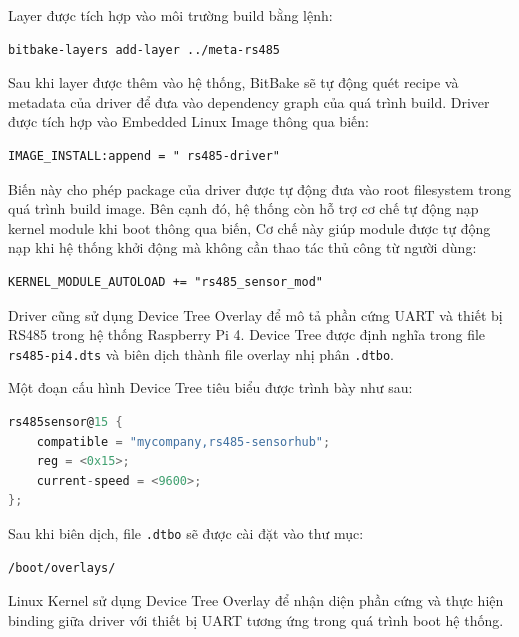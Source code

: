 \medskip 

\renewcommand*\DTstyle{\ttfamily} 

Layer được tích hợp vào môi trường build bằng lệnh:

\begin{verbatim}
bitbake-layers add-layer ../meta-rs485
\end{verbatim}

Sau khi layer được thêm vào hệ thống, BitBake sẽ tự động quét recipe và metadata của driver để đưa vào dependency graph của quá trình build.
Driver được tích hợp vào Embedded Linux Image thông qua biến:

\begin{verbatim}
IMAGE_INSTALL:append = " rs485-driver"
\end{verbatim}

Biến này cho phép package của driver được tự động đưa vào root filesystem trong quá trình build image.
Bên cạnh đó, hệ thống còn hỗ trợ cơ chế tự động nạp kernel module khi boot thông qua biến, Cơ chế này giúp module được tự động nạp khi hệ thống khởi động mà không cần thao tác thủ công từ người dùng:

\begin{verbatim}
KERNEL_MODULE_AUTOLOAD += "rs485_sensor_mod"
\end{verbatim}

Driver cũng sử dụng Device Tree Overlay để mô tả phần cứng UART và thiết bị RS485 trong hệ thống Raspberry Pi 4. Device Tree được định nghĩa trong file \texttt{rs485-pi4.dts} và biên dịch thành file overlay nhị phân \texttt{.dtbo}.

Một đoạn cấu hình Device Tree tiêu biểu được trình bày như sau:

\begin{lstlisting}[style=thesisstyle, language=C]
rs485sensor@15 {
    compatible = "mycompany,rs485-sensorhub";
    reg = <0x15>;
    current-speed = <9600>;
};
\end{lstlisting}

Sau khi biên dịch, file \texttt{.dtbo} sẽ được cài đặt vào thư mục:

\begin{verbatim}
/boot/overlays/
\end{verbatim}

Linux Kernel sử dụng Device Tree Overlay để nhận diện phần cứng và thực hiện binding giữa driver với thiết bị UART tương ứng trong quá trình boot hệ thống.

